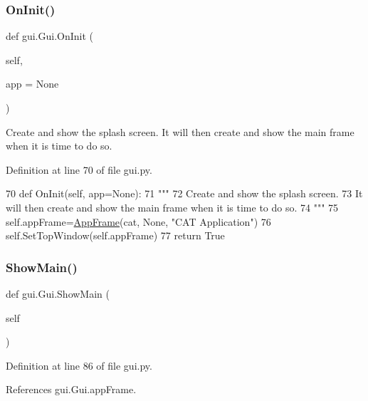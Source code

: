 \subsubsection{\texorpdfstring{On\+Init()}{OnInit()}}
{\footnotesize\ttfamily def gui.\+Gui.\+On\+Init (\begin{DoxyParamCaption}\item[{}]{self,  }\item[{}]{app = {\ttfamily None} }\end{DoxyParamCaption})}

\begin{DoxyVerb}Create and show the splash screen.
It will then create and show the main frame when it is time to do so.
\end{DoxyVerb}
 

Definition at line 70 of file gui.\+py.


\begin{DoxyCode}
70     \textcolor{keyword}{def }OnInit(self, app=None):
71         \textcolor{stringliteral}{"""}
72 \textcolor{stringliteral}{        Create and show the splash screen.}
73 \textcolor{stringliteral}{        It will then create and show the main frame when it is time to do so.}
74 \textcolor{stringliteral}{        """}
75         self.appFrame=\hyperlink{namespaceAppFrame}{AppFrame}(cat, \textcolor{keywordtype}{None}, \textcolor{stringliteral}{"CAT Application"})
76         self.SetTopWindow(self.appFrame)
77         \textcolor{keywordflow}{return} \textcolor{keyword}{True}
\end{DoxyCode}
\mbox{\label{classgui_1_1Gui_a676a880af81990ff051f7f6e4b12e9db}} 
\subsubsection{\texorpdfstring{Show\+Main()}{ShowMain()}}
{\footnotesize\ttfamily def gui.\+Gui.\+Show\+Main (\begin{DoxyParamCaption}\item[{}]{self }\end{DoxyParamCaption})}



Definition at line 86 of file gui.\+py.



References gui.\+Gui.\+app\+Frame.



